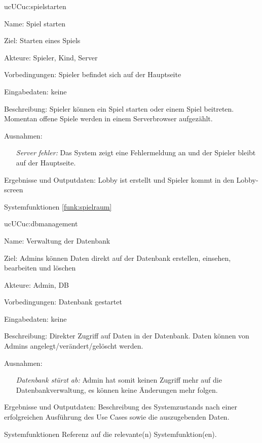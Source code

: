 \begin{description}[leftmargin=5em, style=sameline]
	\begin{lhp}{uc}{UC}{uc:spielstarten}
		\item [Name:] Spiel starten
		\item [Ziel:] Starten eines Spiels
		\item [Akteure:] Spieler, Kind, Server
		\item [Vorbedingungen:] Spieler befindet sich auf der Hauptseite
		\item [Eingabedaten:] keine
		\item [Beschreibung:] Spieler können ein Spiel starten oder einem Spiel beitreten. Momentan offene Spiele werden in einem Serverbrowser aufgezählt.
		\item [Ausnahmen:] \begin{itemize}
			\item[] \textit{Server fehler:} Das System zeigt eine Fehlermeldung an und der Spieler bleibt auf der Hauptseite.
		\end{itemize}
		\item [Ergebnisse und Outputdaten:] Lobby ist erstellt und Spieler kommt in den Lobby-screen
		\item [Systemfunktionen] \ref{funk:spielraum}
	\end{lhp}
	
	\begin{lhp}{uc}{UC}{uc:dbmanagement}
		\item [Name:] Verwaltung der Datenbank
		\item [Ziel:] Admins können Daten direkt auf der Datenbank erstellen, einsehen, bearbeiten und löschen
		\item [Akteure:] Admin, DB
		\item [Vorbedingungen:] Datenbank gestartet
		\item [Eingabedaten:] keine
		\item [Beschreibung:] Direkter Zugriff auf Daten in der Datenbank. Daten können von Admins angelegt/verändert/gelöscht werden.
		\item [Ausnahmen:] \begin{itemize}
			\item[] \textit{Datenbank stürzt ab:} Admin hat somit keinen Zugriff mehr auf die Datenbankverwaltung, es können keine Änderungen mehr folgen.
		\end{itemize}
		\item [Ergebnisse und Outputdaten:] Beschreibung des Systemzustands nach einer erfolgreichen Ausführung des Use Cases sowie die auszugebenden Daten.
		\item [Systemfunktionen] Referenz auf die relevante(n) Systemfunktion(en).
	\end{lhp}


\end{description}
